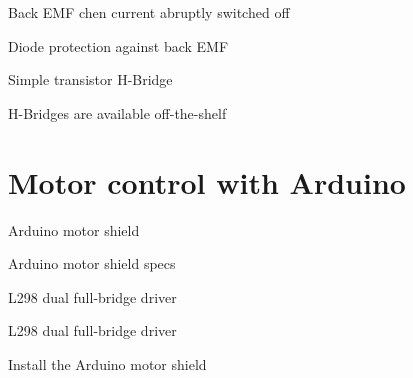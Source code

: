 \documentclass[compress]{beamer}
\begin{document}
{
    \begin{frame}{Back EMF chen current abruptly switched off}
    \end{frame}
}


{
    \begin{frame}{Diode protection against back EMF}
    \end{frame}
}


{
    \begin{frame}{Simple transistor H-Bridge}
    \end{frame}
}


{
    \begin{frame}{H-Bridges are available off-the-shelf}
    \end{frame}
}


\section[Motor \& Arduino]{Motor control with Arduino}

{
    \begin{frame}{Arduino motor shield}
    \end{frame}
}

{
    \begin{frame}{Arduino motor shield specs}
    \end{frame}
}

{
    \begin{frame}{L298 dual full-bridge driver}
    \end{frame}
}

{
    \begin{frame}{L298 dual full-bridge driver}
    \end{frame}
}


{
    \begin{frame}{Install the Arduino motor shield}
    \end{frame}
}
\end{document}
